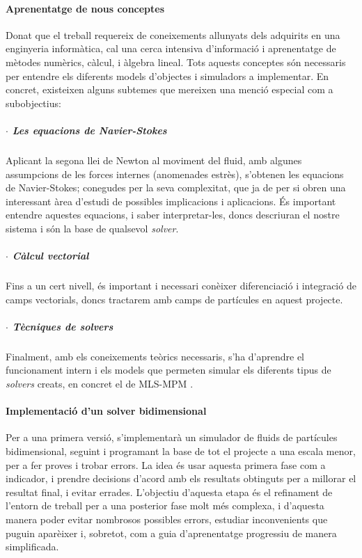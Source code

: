 \documentclass[a4paper]{report}
\begin{document}
	\paragraph{Aprenentatge de nous conceptes} Donat que el treball requereix de coneixements allunyats dels adquirits en una enginyeria informàtica, cal una cerca intensiva d'informació i aprenentatge de mètodes numèrics, càlcul, i àlgebra lineal. Tots aquests conceptes són necessaris per entendre els diferents models d'objectes i simuladors a implementar. \newline
	En concret, existeixen alguns subtemes que mereixen una menció especial com a subobjectius:
	\subparagraph[Navier-Stokes]{$\cdot$ Les equacions de Navier-Stokes} Aplicant la segona llei de Newton al moviment del fluid, amb algunes assumpcions de les forces internes (anomenades estrès), s'obtenen les equacions de Navier-Stokes; conegudes per la seva complexitat, que ja de per si obren una interessant àrea d'estudi de possibles implicacions i aplicacions.
	\newline
	És important entendre aquestes equacions, i saber interpretar-les, doncs descriuran el nostre sistema i són la base de qualsevol \textit{solver}.
	\subparagraph[Càlcul vectorial]{$\cdot$ Càlcul vectorial} Fins a un cert nivell, és important i necessari conèixer diferenciació i integració de camps vectorials, doncs tractarem amb camps de partícules en aquest projecte.
	\subparagraph[Tècniques de solvers]{$\cdot$ Tècniques de solvers} Finalment, amb els coneixements teòrics necessaris, s'ha d'aprendre el funcionament intern i els models que permeten simular els diferents tipus de \textit{solvers} creats, en concret el de MLS-MPM \cite{hu2018mlsmpmcpic}.
	
	\paragraph{Implementació d'un solver bidimensional} Per a una primera versió, s'implementarà un simulador de fluids de partícules bidimensional, seguint\cite{Hu,hu2018mlsmpmcpic} i programant la base de tot el projecte a una escala menor, per a fer proves i trobar errors. La idea és usar aquesta primera fase com a indicador, i prendre decisions d'acord amb els resultats obtinguts per a millorar el resultat final, i evitar errades. \newline
	L'objectiu d'aquesta etapa és el refinament de l'entorn de treball per a una posterior fase molt més complexa, i d'aquesta manera poder evitar nombrosos possibles errors, estudiar inconvenients que puguin aparèixer i, sobretot, com a guia d'aprenentatge progressiu de manera simplificada. 
	
\end{document}

